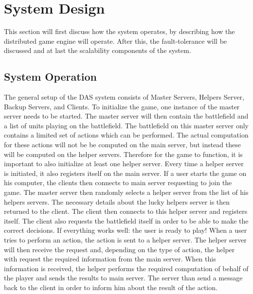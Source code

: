 \section{System Design}
This section will first discuss how the system operates, by describing how the distributed game engine will operate.
After this, the fault-tolerance will be discussed and at last the scalability components of the system.

\subsection{System Operation}
The general setup of the DAS system consists of Master Servers, Helpers Server, Backup Servers, and Clients.
To initialize the game, one instance of the master server needs to be started. 
The master server will then contain the battlefield and a list of units playing on the battlefield.
The battlefield on this master server only contains a limited set of actions which can be performed.
The actual computation for these actions will not be be computed on the main server, but instead these will be computed on the helper servers.
Therefore for the game to function, it is important to also initialize at least one helper server. 
Every time a helper server is initiated, it also registers itself on the main server.
If a user starts the game on his computer, the clients then connects to main server requesting to join the game.
The master server then randomly selects a helper server from the list of his helpers servers.
The necessary details about the lucky helpers server is then returned to the client. 
The client then connects to this helper server and registers itself.
The client also requests the battlefield itself in order to be able to make the correct decisions. 
If everything works well: the user is ready to play!
When a user tries to perform an action, the action is sent to a helper server.
The helper server will then receive the request and, depending on the type of action, the helper with request the required information from the main server.
When this information is received, the helper performs the required computation of behalf of the player and sends the results to main server.
The server than send a message back to the client in order to inform him about the result of the action.

